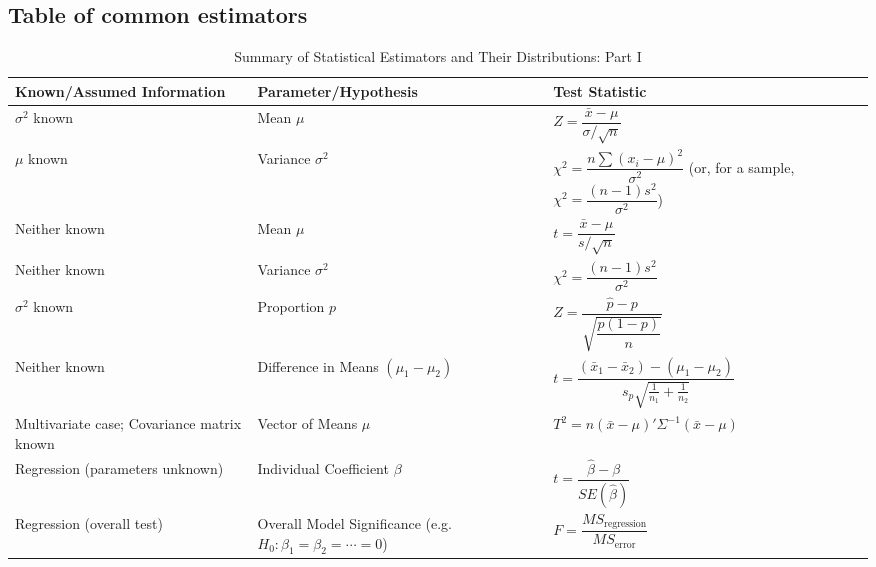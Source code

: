 \documentclass{article}
\begin{document}
\subsection{Table of common estimators}


\begin{table}[H]
\centering
\caption{Summary of Statistical Estimators and Their Distributions: Part I}
\label{tab:estimators_part1}
\renewcommand{\arraystretch}{1.3}
\begin{tabular}{@{}p{5cm} p{4cm} p{6cm}@{}}
\toprule
\textbf{Known/Assumed Information} & \textbf{Parameter/Hypothesis} & \textbf{Test Statistic} \\
\midrule
$\sigma^2$ known  & Mean $\mu$ & 
$Z = \dfrac{\bar{x} - \mu}{\sigma/\sqrt{n}}$ \\[5pt]
\midrule
$\mu$ known  & Variance $\sigma^2$ & 
$\chi^2 = \dfrac{n\sum (x_i-\mu)^2}{\sigma^2}$ 
(or, for a sample, $\chi^2 = \dfrac{(n-1)s^2}{\sigma^2}$) \\[10pt]
\midrule
Neither known  & Mean $\mu$ &
$t = \dfrac{\bar{x} - \mu}{s/\sqrt{n}}$ \\[5pt]
\midrule
Neither known  & Variance $\sigma^2$ &
$\chi^2 = \dfrac{(n-1)s^2}{\sigma^2}$ \\[5pt]
\midrule
$\sigma^2$ known  & Proportion $p$ &
$Z = \dfrac{\hat{p} - p}{\sqrt{\dfrac{p(1-p)}{n}}}$ \\[5pt]
\midrule
Neither known  & Difference in Means $(\mu_1-\mu_2)$ &
$t = \dfrac{(\bar{x}_1-\bar{x}_2) - (\mu_1-\mu_2)}{s_p\sqrt{\frac{1}{n_1}+\frac{1}{n_2}}}$ \\[5pt]
\midrule
Multivariate case; Covariance matrix known  & Vector of Means $\mu$ &
$T^2 = n(\bar{x}-\mu)'\Sigma^{-1}(\bar{x}-\mu)$ \\[5pt]
\midrule
Regression (parameters unknown)  & Individual Coefficient $\beta$ &
$t = \dfrac{\hat{\beta} - \beta}{SE(\hat{\beta})}$ \\[5pt]
\midrule
Regression (overall test)  & Overall Model Significance \newline (e.g. $H_0: \beta_1=\beta_2=\cdots=0$) &
$F = \dfrac{MS_\text{regression}}{MS_\text{error}}$ \\
\bottomrule
\end{tabular}
\end{table}

\vspace{1em}
\end{document}
